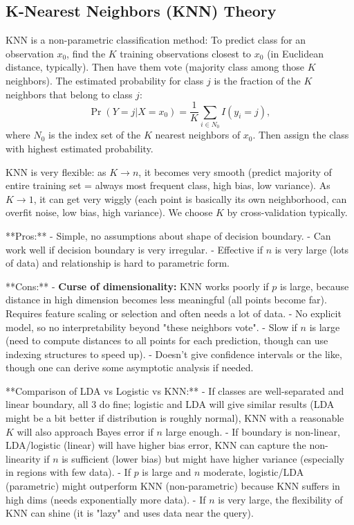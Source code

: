\documentclass[11pt]{article}
\begin{document}
\subsection{K-Nearest Neighbors (KNN) Theory}
KNN is a non-parametric classification method:
To predict class for an observation $x_0$, find the $K$ training observations closest to $x_0$ (in Euclidean distance, typically). Then have them vote (majority class among those $K$ neighbors). The estimated probability for class $j$ is the fraction of the $K$ neighbors that belong to class $j$:
\[ \Pr(Y=j|X=x_0) = \frac{1}{K} \sum_{i \in N_0} I(y_i = j), \] 
where $N_0$ is the index set of the $K$ nearest neighbors of $x_0$. Then assign the class with highest estimated probability.

KNN is very flexible: as $K \to n$, it becomes very smooth (predict majority of entire training set = always most frequent class, high bias, low variance). As $K \to 1$, it can get very wiggly (each point is basically its own neighborhood, can overfit noise, low bias, high variance). We choose $K$ by cross-validation typically.

**Pros:** 
- Simple, no assumptions about shape of decision boundary.
- Can work well if decision boundary is very irregular.
- Effective if $n$ is very large (lots of data) and relationship is hard to parametric form.

**Cons:** 
- \textbf{Curse of dimensionality:} KNN works poorly if $p$ is large, because distance in high dimension becomes less meaningful (all points become far). Requires feature scaling or selection and often needs a lot of data.
- No explicit model, so no interpretability beyond "these neighbors vote".
- Slow if $n$ is large (need to compute distances to all points for each prediction, though can use indexing structures to speed up).
- Doesn’t give confidence intervals or the like, though one can derive some asymptotic analysis if needed.

**Comparison of LDA vs Logistic vs KNN:**
- If classes are well-separated and linear boundary, all 3 do fine; logistic and LDA will give similar results (LDA might be a bit better if distribution is roughly normal), KNN with a reasonable $K$ will also approach Bayes error if $n$ large enough.
- If boundary is non-linear, LDA/logistic (linear) will have higher bias error, KNN can capture the non-linearity if $n$ is sufficient (lower bias) but might have higher variance (especially in regions with few data).
- If $p$ is large and $n$ moderate, logistic/LDA (parametric) might outperform KNN (non-parametric) because KNN suffers in high dims (needs exponentially more data).
- If $n$ is very large, the flexibility of KNN can shine (it is "lazy" and uses data near the query).
\end{document}
